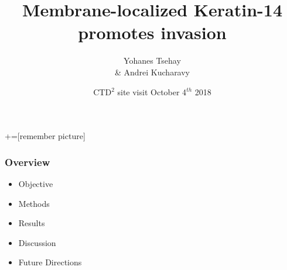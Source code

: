 \documentclass{beamer} %
\title{Membrane-localized Keratin-14 \\ promotes invasion}
\author{Yohanes Tsehay \\ \& Andrei Kucharavy}
\institute{Joel Bader's Lab}
\date{CTD$^2$ site visit October 4$^{th}$ 2018}
\begin{document}
+=[remember picture]

\everymath{\displaystyle}

\frame{\titlepage}

\begin{frame}
\frametitle{Overview}

\begin{itemize}
		\item Objective
		\item Methods
		\item Results
		\item Discussion
		\item Future Directions
\end{itemize}

\end{frame}




\end{document}
